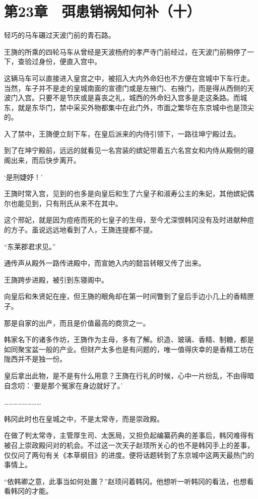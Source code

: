 \section{第23章　弭患销祸知何补（十）}

轻巧的马车碾过天波门前的青石路。

王旖的所乘的四轮马车从曾经是天波杨府的孝严寺门前经过，在天波门前稍停了一下，查验过身份，便直入宫中。

这辆马车可以直接进入皇宫之中，被招入大内外命妇也不方便在宫城中下车行走。当然，车子并不是走的皇城南面的宣德门或是左掖门、右掖门，而是得从西侧的天波门入宫。只要不是节庆或是喜丧之礼，城西的外命妇入宫多是走这条路。而城东，就是东华门，禁中采买外物都集中在此门外，市面之繁华在东京城中也是顶尖的。

入了禁中，王旖便立刻下车，在皇后派来的内侍引领下，一路往坤宁殿过去。

到了在坤宁殿前，远远的就看见一名宫装的嫔妃带着五六名宫女和内侍从殿侧的寝阁出来，而后快步离开。

‘是刑婕妤！’

王旖时常入宫，见到的也多是向皇后和生了六皇子和淑寿公主的朱妃，其他嫔妃偶尔也能见到，只有刑氏从来不在其中。

这个邢妃，就是因为痘疮而死的七皇子的生母，至今尤深恨韩冈没有及时进献种痘的方子。虽说远远地看到了人，王旖连提都不提。

“东莱郡君求见。”

通传声从殿外一路传进殿中，而宣她入内的懿旨转眼又传了出来。

王旖跨步进殿，被引到东寝阁中。

向皇后和朱贤妃在座，但王旖的眼角却在第一时间瞥到了皇后手边小几上的香精匣子。

那是自家的出产，而且是价值最高的商货之一。

韩家名下的诸多作坊，王旖作为主母，多有了解。织造、玻璃、香精、制糖，都是如同聚宝盆一般的产业。但财产太多也是有问题的，唯一值得庆幸的是香精工坊在陇西并不是独一份。

皇后拿出此物，是不是有什么用意？王旖在行礼的时候，心中一片纷乱，不由得暗自念叨：‘要是那个冤家在身边就好了。’

……………………

韩冈此时也在皇城之中，不是太常寺，而是崇政殿。

在做了判太常寺，主管厚生司、太医局，又担负起编纂药典的差事后，韩冈难得有被召上崇政殿问对的机会。不过这一次天子赵顼所关心的也不是韩冈手上的差事，仅仅问了两句有关《本草纲目》的进度。便将话题转到了东京城中这两天最热门的事情上。

“依韩卿之意，此事当如何处置？”赵顼问着韩冈。他想听一听韩冈的看法，也想看看韩冈的才能。

